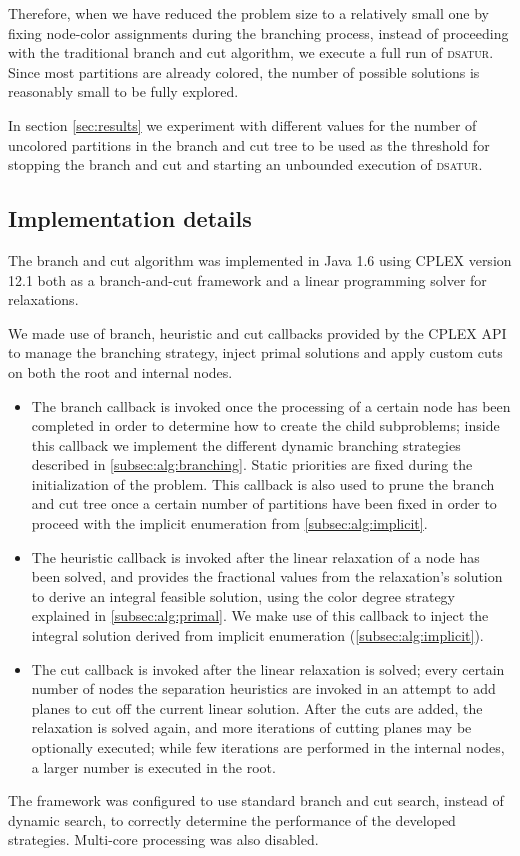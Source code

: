 Therefore, when we have reduced the problem size to a relatively small one by fixing node-color assignments during the branching process, instead of proceeding with the traditional branch and cut algorithm, we execute a full run of \textsc{dsatur}. Since most partitions are already colored, the number of possible solutions is reasonably small to be fully explored.

In section \ref{sec:results} we experiment with different values for the number of uncolored partitions in the branch and cut tree to be used as the threshold for stopping the branch and cut and starting an unbounded execution of \textsc{dsatur}.

\subsection{Implementation details}

The branch and cut algorithm was implemented in Java 1.6 using CPLEX version 12.1 both as a branch-and-cut framework and a linear programming solver for relaxations. 

We made use of branch, heuristic and cut callbacks provided by the CPLEX API to manage the branching strategy, inject primal solutions and apply custom cuts on both the root and internal nodes.
\begin{itemize}
\item{The branch callback is invoked once the processing of a certain node has been completed in order to determine how to create the child subproblems; inside this callback we implement the different dynamic branching strategies described in \ref{subsec:alg:branching}. Static priorities are fixed during the initialization of the problem. This callback is also used to prune the branch and cut tree once a certain number of partitions have been fixed in order to proceed with the implicit enumeration from \ref{subsec:alg:implicit}.}
\item{The heuristic callback is invoked after the linear relaxation of a node has been solved, and provides the fractional values from the relaxation's solution to derive an integral feasible solution, using the color degree strategy explained in \ref{subsec:alg:primal}. We make use of this callback to inject the integral solution derived from implicit enumeration (\ref{subsec:alg:implicit}).}
\item{The cut callback is invoked after the linear relaxation is solved; every certain number of nodes the separation heuristics are invoked in an attempt to add planes to cut off the current linear solution. After the cuts are added, the relaxation is solved again, and more iterations of cutting planes may be optionally executed; while few iterations are performed in the internal nodes, a larger number is executed in the root.}
\end{itemize} 

The framework was configured to use standard branch and cut search, instead of dynamic search, to correctly determine the performance of the developed strategies. Multi-core processing was also disabled.